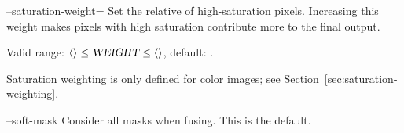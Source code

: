 \begin{codelist}
  \label{opt:saturation-weight}%
\item[--saturation-weight=\metavar{WEIGHT}]\itemend Set the relative
   of high-saturation pixels.  Increasing this weight
  makes pixels with high saturation contribute more to the final
  output.

  Valid range: $\val{val:minimum-weight-saturation} \leq
  \metavar{WEIGHT} \leq \val{val:maximum-weight-saturation}$, default:
  .

  Saturation weighting is only defined for color images; see
  Section~\ref{sec:saturation-weighting}.


  \label{opt:soft-mask}%
\item[--soft-mask]\itemend Consider all masks when fusing.  This is
  the default.
\end{codelist}

